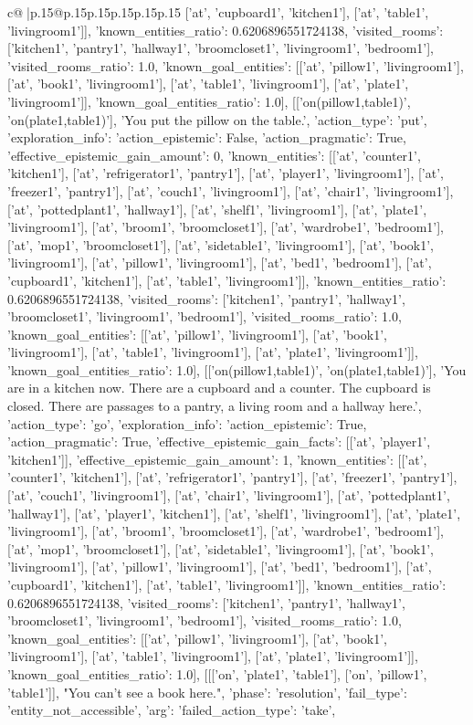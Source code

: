 \documentclass{article}
\begin{document}
{\begin{supertabular}{c@{$\;$}|p{.15\linewidth}@{}p{.15\linewidth}p{.15\linewidth}p{.15\linewidth}p{.15\linewidth}p{.15\linewidth}}
{{{['at', 'cupboard1', 'kitchen1'], ['at', 'table1', 'livingroom1']], 'known_entities_ratio': 0.6206896551724138, 'visited_rooms': ['kitchen1', 'pantry1', 'hallway1', 'broomcloset1', 'livingroom1', 'bedroom1'], 'visited_rooms_ratio': 1.0, 'known_goal_entities': [['at', 'pillow1', 'livingroom1'], ['at', 'book1', 'livingroom1'], ['at', 'table1', 'livingroom1'], ['at', 'plate1', 'livingroom1']], 'known_goal_entities_ratio': 1.0}}], [['on(pillow1,table1)', 'on(plate1,table1)'], 'You put the pillow on the table.', {'action_type': 'put', 'exploration_info': {'action_epistemic': False, 'action_pragmatic': True, 'effective_epistemic_gain_amount': 0, 'known_entities': [['at', 'counter1', 'kitchen1'], ['at', 'refrigerator1', 'pantry1'], ['at', 'player1', 'livingroom1'], ['at', 'freezer1', 'pantry1'], ['at', 'couch1', 'livingroom1'], ['at', 'chair1', 'livingroom1'], ['at', 'pottedplant1', 'hallway1'], ['at', 'shelf1', 'livingroom1'], ['at', 'plate1', 'livingroom1'], ['at', 'broom1', 'broomcloset1'], ['at', 'wardrobe1', 'bedroom1'], ['at', 'mop1', 'broomcloset1'], ['at', 'sidetable1', 'livingroom1'], ['at', 'book1', 'livingroom1'], ['at', 'pillow1', 'livingroom1'], ['at', 'bed1', 'bedroom1'], ['at', 'cupboard1', 'kitchen1'], ['at', 'table1', 'livingroom1']], 'known_entities_ratio': 0.6206896551724138, 'visited_rooms': ['kitchen1', 'pantry1', 'hallway1', 'broomcloset1', 'livingroom1', 'bedroom1'], 'visited_rooms_ratio': 1.0, 'known_goal_entities': [['at', 'pillow1', 'livingroom1'], ['at', 'book1', 'livingroom1'], ['at', 'table1', 'livingroom1'], ['at', 'plate1', 'livingroom1']], 'known_goal_entities_ratio': 1.0}}], [['on(pillow1,table1)', 'on(plate1,table1)'], 'You are in a kitchen now. There are a cupboard and a counter. The cupboard is closed. There are passages to a pantry, a living room and a hallway here.', {'action_type': 'go', 'exploration_info': {'action_epistemic': True, 'action_pragmatic': True, 'effective_epistemic_gain_facts': [['at', 'player1', 'kitchen1']], 'effective_epistemic_gain_amount': 1, 'known_entities': [['at', 'counter1', 'kitchen1'], ['at', 'refrigerator1', 'pantry1'], ['at', 'freezer1', 'pantry1'], ['at', 'couch1', 'livingroom1'], ['at', 'chair1', 'livingroom1'], ['at', 'pottedplant1', 'hallway1'], ['at', 'player1', 'kitchen1'], ['at', 'shelf1', 'livingroom1'], ['at', 'plate1', 'livingroom1'], ['at', 'broom1', 'broomcloset1'], ['at', 'wardrobe1', 'bedroom1'], ['at', 'mop1', 'broomcloset1'], ['at', 'sidetable1', 'livingroom1'], ['at', 'book1', 'livingroom1'], ['at', 'pillow1', 'livingroom1'], ['at', 'bed1', 'bedroom1'], ['at', 'cupboard1', 'kitchen1'], ['at', 'table1', 'livingroom1']], 'known_entities_ratio': 0.6206896551724138, 'visited_rooms': ['kitchen1', 'pantry1', 'hallway1', 'broomcloset1', 'livingroom1', 'bedroom1'], 'visited_rooms_ratio': 1.0, 'known_goal_entities': [['at', 'pillow1', 'livingroom1'], ['at', 'book1', 'livingroom1'], ['at', 'table1', 'livingroom1'], ['at', 'plate1', 'livingroom1']], 'known_goal_entities_ratio': 1.0}}], [[['on', 'plate1', 'table1'], ['on', 'pillow1', 'table1']], "You can't see a book here.", {'phase': 'resolution', 'fail_type': 'entity_not_accessible', 'arg': {'failed_action_type': 'take', }}}
\end{supertabular}}
\end{document}
